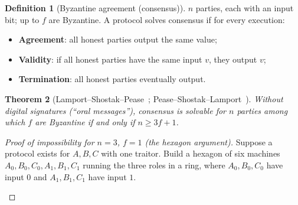 \documentclass[11pt,a4paper]{article}
\newenvironment{formal}{\par\smallskip}{\par\smallskip}
\theoremstyle{definition}
\newtheorem{definition}{Definition}[section]
\theoremstyle{plain}
\newtheorem{theorem}[definition]{Theorem}
\theoremstyle{remark}
\begin{document}
\begin{formal}
\begin{definition}[Byzantine agreement (consensus)]
$n$ parties, each with an input bit; up to $f$ are Byzantine. A protocol solves consensus if for every execution:
\begin{itemize}[nosep]
\item \textbf{Agreement}: all honest parties output the same value;
\item \textbf{Validity}: if all honest parties have the same input $v$, they output $v$;
\item \textbf{Termination}: all honest parties eventually output.
\end{itemize}
\end{definition}

\begin{theorem}[Lamport--Shostak--Pease~\cite{LSP82}; Pease--Shostak--Lamport~\cite{PSL80}]\label{thm:3f}
Without digital signatures (``oral messages''), consensus is solvable for $n$ parties among which $f$ are Byzantine if and only if $n\ge 3f+1$.
\end{theorem}
\begin{proof}[Proof of impossibility for $n=3$, $f=1$ (the hexagon argument)]
Suppose a protocol exists for $A,B,C$ with one traitor. Build a hexagon of six machines $A_0,B_0,C_0,A_1,B_1,C_1$ running the three roles in a ring, where $A_0,B_0,C_0$ have input $0$ and $A_1,B_1,C_1$ have input $1$.
\begin{center}
\end{center}

\end{proof}
\end{formal}
\end{document}
